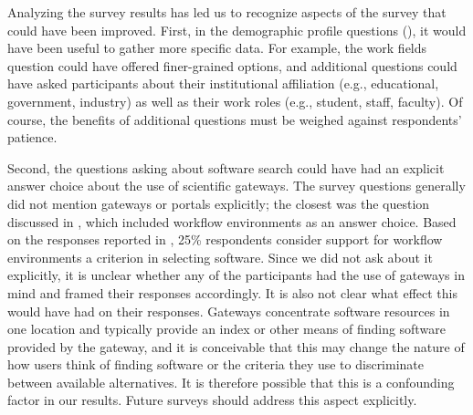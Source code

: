 \documentclass{casicswhitepaper}
\begin{document}


Analyzing the survey results has led us to recognize aspects of the survey that could have been improved.  First, in the demographic profile questions (), it would have been useful to gather more specific data.  For example, the work fields question could have offered finer-grained options, and additional questions could have asked participants about their institutional affiliation (e.g., educational, government, industry) as well as their work roles (e.g., student, staff, faculty).  Of course, the benefits of additional questions must be weighed against respondents' patience.

Second, the questions asking about software search could have had an explicit answer choice about the use of scientific gateways.  The survey questions generally did not mention gateways or portals explicitly; the closest was the question discussed in , which included workflow environments as an answer choice.  Based on the responses reported in , 25\% respondents consider support for workflow environments a criterion in selecting software.  Since we did not ask about it explicitly, it is unclear whether any of the participants had the use of gateways in mind and framed their responses accordingly.  It is also not clear what effect this would have had on their responses.  Gateways concentrate software resources in one location and typically provide an index or other means of finding software provided by the gateway, and it is conceivable that this may change the nature of how users think of finding software or the criteria they use to discriminate between available alternatives.  It is therefore possible that this is a confounding factor in our results.  Future surveys should address this aspect explicitly.
\end{document}
